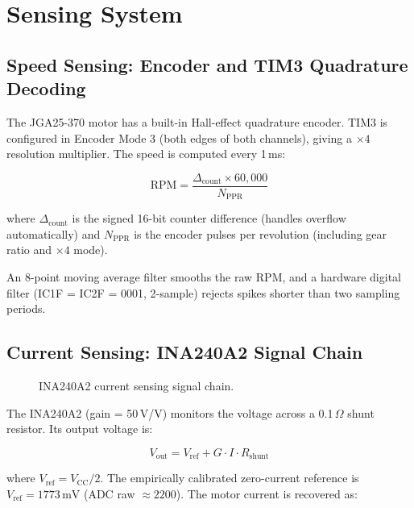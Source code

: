 \documentclass[12pt, a4paper]{report}
\begin{document}
\section{Sensing System}

\subsection{Speed Sensing: Encoder and TIM3 Quadrature Decoding}

The JGA25-370 motor has a built-in Hall-effect quadrature encoder. TIM3 is
configured in Encoder Mode 3 (both edges of both channels), giving a
$\times4$ resolution multiplier. The speed is computed every 1\,ms:

\begin{equation}
    \text{RPM} = \frac{\Delta_{\text{count}} \times 60{,}000}
                      {N_{\text{PPR}}}
    \label{eq:rpm}
\end{equation}

where $\Delta_{\text{count}}$ is the signed 16-bit counter difference (handles
overflow automatically) and $N_{\text{PPR}}$ is the encoder pulses per
revolution (including gear ratio and $\times4$ mode).

An 8-point moving average filter smooths the raw RPM, and a hardware digital
filter (IC1F = IC2F = 0001, 2-sample) rejects spikes shorter than two
sampling periods.

\subsection{Current Sensing: INA240A2 Signal Chain}

\begin{figure}[H]
    \centering
    \caption{INA240A2 current sensing signal chain.}
    \label{fig:ina240}
\end{figure}

The INA240A2 (gain = 50\,V/V) monitors the voltage across a 0.1\,$\Omega$
shunt resistor. Its output voltage is:

\begin{equation}
    V_{\text{out}} = V_{\text{ref}} + G \cdot I \cdot R_{\text{shunt}}
    \label{eq:ina240_out}
\end{equation}

where $V_{\text{ref}} = V_{\text{CC}}/2$. The empirically calibrated
zero-current reference is $V_{\text{ref}} = 1773\,\text{mV}$ (ADC raw
$\approx 2200$). The motor current is recovered as:
\end{document}
